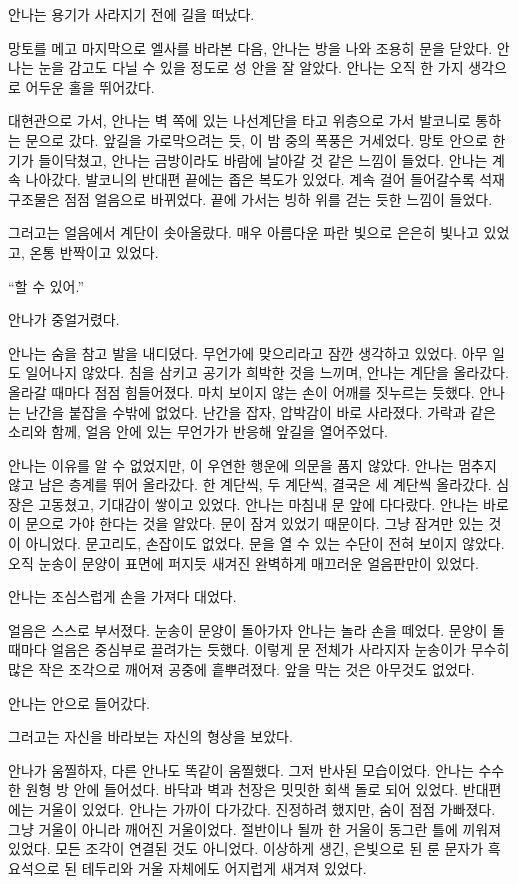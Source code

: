 안나는 용기가 사라지기 전에 길을 떠났다.

망토를 메고 마지막으로 엘사를 바라본 다음, 안나는 방을 나와 조용히 문을 닫았다. 안나는 눈을 감고도 다닐 수 있을 정도로 성 안을 잘 알았다. 안나는 오직 한 가지 생각으로 어두운 홀을 뛰어갔다.

대현관으로 가서, 안나는 벽 쪽에 있는 나선계단을 타고 위층으로 가서 발코니로 통하는 문으로 갔다. 앞길을 가로막으려는 듯, 이 밤 중의 폭풍은 거세었다. 망토 안으로 한기가 들이닥쳤고, 안나는 금방이라도 바람에 날아갈 것 같은 느낌이 들었다. 안나는 계속 나아갔다. 발코니의 반대편 끝에는 좁은 복도가 있었다. 계속 걸어 들어갈수록 석재 구조물은 점점 얼음으로 바뀌었다. 끝에 가서는 빙하 위를 걷는 듯한 느낌이 들었다.

그러고는 얼음에서 계단이 솟아올랐다. 매우 아름다운 파란 빛으로 은은히 빛나고 있었고, 온통 반짝이고 있었다.

``할 수 있어.''

안나가 중얼거렸다.

안나는 숨을 참고 발을 내디뎠다. 무언가에 맞으리라고 잠깐 생각하고 있었다. 아무 일도 일어나지 않았다. 침을 삼키고 공기가 희박한 것을 느끼며, 안나는 계단을 올라갔다. 올라갈 때마다 점점 힘들어졌다. 마치 보이지 않는 손이 어깨를 짓누르는 듯했다. 안나는 난간을 붙잡을 수밖에 없었다. 난간을 잡자, 압박감이 바로 사라졌다. 가락과 같은 소리와 함께, 얼음 안에 있는 무언가가 반응해 앞길을 열어주었다.

안나는 이유를 알 수 없었지만, 이 우연한 행운에 의문을 품지 않았다. 안나는 멈추지 않고 남은 층계를 뛰어 올라갔다. 한 계단씩, 두 계단씩, 결국은 세 계단씩 올라갔다. 심장은 고동쳤고, 기대감이 쌓이고 있었다. 안나는 마침내 문 앞에 다다랐다. 안나는 바로 이 문으로 가야 한다는 것을 알았다. 문이 잠겨 있었기 때문이다. 그냥 잠겨만 있는 것이 아니었다. 문고리도, 손잡이도 없었다. 문을 열 수 있는 수단이 전혀 보이지 않았다. 오직 눈송이 문양이 표면에 퍼지듯 새겨진 완벽하게 매끄러운 얼음판만이 있었다.

안나는 조심스럽게 손을 가져다 대었다.

얼음은 스스로 부서졌다. 눈송이 문양이 돌아가자 안나는 놀라 손을 떼었다. 문양이 돌 때마다 얼음은 중심부로 끌려가는 듯했다. 이렇게 문 전체가 사라지자 눈송이가 무수히 많은 작은 조각으로 깨어져 공중에 흩뿌려졌다. 앞을 막는 것은 아무것도 없었다.

안나는 안으로 들어갔다.

그러고는 자신을 바라보는 자신의 형상을 보았다.

안나가 움찔하자, 다른 안나도 똑같이 움찔했다. 그저 반사된 모습이었다. 안나는 수수한 원형 방 안에 들어섰다. 바닥과 벽과 천장은 밋밋한 회색 돌로 되어 있었다. 반대편에는 거울이 있었다. 안나는 가까이 다가갔다. 진정하려 했지만, 숨이 점점 가빠졌다. 그냥 거울이 아니라 깨어진 거울이었다. 절반이나 될까 한 거울이 동그란 틀에 끼워져 있었다. 모든 조각이 연결된 것도 아니었다. 이상하게 생긴, 은빛으로 된 룬 문자가 흑요석으로 된 테두리와 거울 자체에도 어지럽게 새겨져 있었다.

